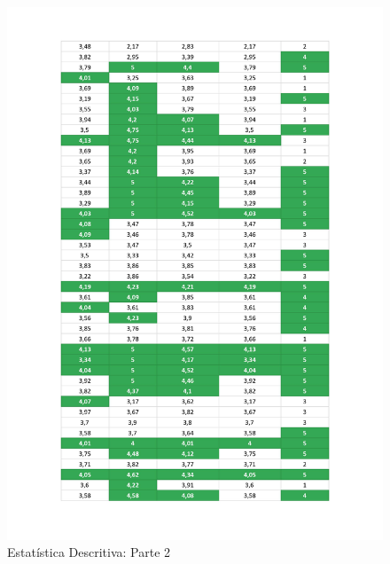 \begin{figure}[H]
	\centering
	\includegraphics[width=1\linewidth]{imagens/findMusicResultados2.jpg}
	\caption[Estatística Descritiva: Parte 2]{Estatística Descritiva: Parte 2}
    \label{fig:findMusicEstatistica2}
\end{figure}

